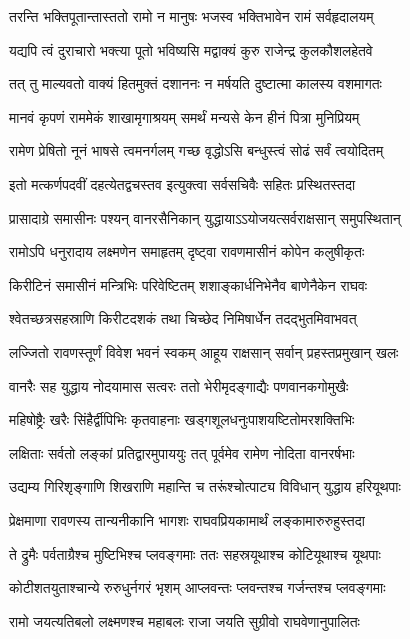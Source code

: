 \twolineshloka
{तरन्ति भक्तिपूतान्तास्ततो रामो न मानुषः}
{भजस्व भक्तिभावेन रामं सर्वहृदालयम्} %

\twolineshloka
{यद्यपि त्वं दुराचारो भक्त्या पूतो भविष्यसि}
{मद्वाक्यं कुरु राजेन्द्र कुलकौशलहेतवे} %

\twolineshloka
{तत् तु माल्यवतो वाक्यं हितमुक्तं दशाननः}
{न मर्षयति दुष्टात्मा कालस्य वशमागतः} %

\twolineshloka
{मानवं कृपणं राममेकं शाखामृगाश्रयम्}
{समर्थं मन्यसे केन हीनं पित्रा मुनिप्रियम्} %

\twolineshloka
{रामेण प्रेषितो नूनं भाषसे त्वमनर्गलम्}
{गच्छ वृद्धोऽसि बन्धुस्त्वं सोढं सर्वं त्वयोदितम्} %

\twolineshloka
{इतो मत्कर्णपदवीं दहत्येतद्वचस्तव}
{इत्युक्त्वा सर्वसचिवैः सहितः प्रस्थितस्तदा} %

\twolineshloka
{प्रासादाग्रे समासीनः पश्यन् वानरसैनिकान्}
{युद्धायाऽऽयोजयत्सर्वराक्षसान् समुपस्थितान्} %

\twolineshloka
{रामोऽपि धनुरादाय लक्ष्मणेन समाहृतम्}
{दृष्ट्वा रावणमासीनं कोपेन कलुषीकृतः} %

\twolineshloka
{किरीटिनं समासीनं मन्त्रिभिः परिवेष्टितम्}
{शशाङ्कार्धनिभेनैव बाणेनैकेन राघवः} %

\twolineshloka
{श्वेतच्छत्रसहस्राणि किरीटदशकं तथा}
{चिच्छेद निमिषार्धेन तदद्भुतमिवाभवत्} %

\twolineshloka
{लज्जितो रावणस्तूर्णं विवेश भवनं स्वकम्}
{आहूय राक्षसान् सर्वान् प्रहस्तप्रमुखान् खलः} %

\twolineshloka
{वानरैः सह युद्धाय नोदयामास सत्वरः}
{ततो भेरीमृदङ्गाद्यैः पणवानकगोमुखैः} %

\twolineshloka
{महिषोष्ट्रैः खरैः सिंहैर्द्वीपिभिः कृतवाहनाः}
{खड्गशूलधनुःपाशयष्टितोमरशक्तिभिः} %

\twolineshloka
{लक्षिताः सर्वतो लङ्कां प्रतिद्वारमुपाययुः}
{तत् पूर्वमेव रामेण नोदिता वानरर्षभाः} %

\twolineshloka
{उद्यम्य गिरिशृङ्गाणि शिखराणि महान्ति च}
{तरूंश्चोत्पाट्य विविधान् युद्धाय हरियूथपाः} %

\twolineshloka
{प्रेक्षमाणा रावणस्य तान्यनीकानि भागशः}
{राघवप्रियकामार्थं लङ्कामारुरुहुस्तदा} %

\twolineshloka
{ते द्रुमैः पर्वताग्रैश्च मुष्टिभिश्च प्लवङ्गमाः}
{ततः सहस्रयूथाश्च कोटियूथाश्च यूथपाः} %

\twolineshloka
{कोटीशतयुताश्चान्ये रुरुधुर्नगरं भृशम्}
{आप्लवन्तः प्लवन्तश्च गर्जन्तश्च प्लवङ्गमाः} %

\twolineshloka
{रामो जयत्यतिबलो लक्ष्मणश्च महाबलः}
{राजा जयति सुग्रीवो राघवेणानुपालितः} %

